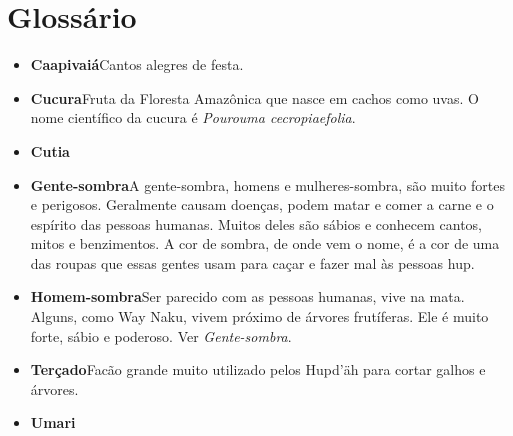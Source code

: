 \blankpage
{}
\chapter{Glossário}

\begin{itemize}
\item{\formular\textbf{Caapivaiá}}\quad Cantos alegres de festa.\smallskip
\item{\formular\textbf{Cucura}}\quad Fruta da Floresta Amazônica que nasce em cachos
como uvas. O nome científico da cucura é \textit{Pourouma cecropiaefolia}.\smallskip
\item{\formular\textbf{Cutia}}\quad {}\smallskip
\item{\formular\textbf{Gente-sombra}}\quad A gente-sombra, homens e mulheres-sombra, são
muito fortes e perigosos. Geralmente causam doenças, podem matar
e comer a carne e o espírito das pessoas humanas. Muitos deles
são sábios e conhecem cantos, mitos e benzimentos. A cor de
sombra, de onde vem o nome, é a cor de uma das roupas que essas gentes
usam para caçar e fazer mal às pessoas hup.\smallskip
\item{\formular\textbf{Homem-sombra}}\quad Ser parecido com as pessoas
humanas, vive na mata. Alguns, como Way Naku, vivem próximo de árvores frutíferas. Ele
é muito forte, sábio e poderoso. Ver \textit{Gente-sombra}.\smallskip
\item{\formular\textbf{Terçado}}\quad Facão grande muito utilizado pelos Hupd’äh para cortar
galhos e árvores.\smallskip
\item{\formular\textbf{Umari}}\quad {}
\end{itemize}

